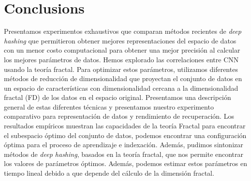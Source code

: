 \section{Conclusions}
Presentamos experimentos exhaustivos que comparan métodos recientes de \textit{deep hashing} que permitieron obtener mejores representaciones del espacio de datos con un menor costo computacional para obtener una mejor precisión al calcular los mejores parámetros de datos. Hemos explorado las correlaciones entre CNN usando la teoría fractal. Para optimizar estos parámetros, utilizamos diferentes métodos de reducción de dimensionalidad que proyectan el conjunto de datos en un espacio de características con dimensionalidad cercana a la dimensionalidad fractal (FD) de los datos en el espacio original. Presentamos una descripción general de estas diferentes técnicas y presentamos nuestro experimento comparativo para representación de datos y rendimiento de recuperación. Los resultados empíricos muestran las capacidades de la teoría Fractal para encontrar el subespacio óptimo del conjunto de datos, podemos encontrar una configuración óptima para el proceso de aprendizaje e indexación. Además, pudimos sintonizar métodos de \textit{deep hashing}, basados en la teoría fractal, que nos permite encontrar los valores de parámetros óptimos. Además, podemos estimar estos parámetros en tiempo lineal debido a que depende del cálculo de la dimensión fractal.